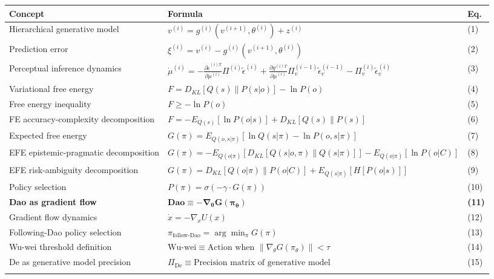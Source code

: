 \documentclass[11pt,a4paper]{article}
\begin{document}
\begin{longtable}{@{}p{4.5cm}p{8.5cm}p{1.5cm}@{}}
\toprule
\textbf{Concept} & \textbf{Formula} & \textbf{Eq.} \\
\midrule
Hierarchical generative model & $v^{(i)} = g^{(i)}(v^{(i+1)}, \theta^{(i)}) + z^{(i)}$ & (1) \\
\addlinespace
Prediction error & $\xi^{(i)} = v^{(i)} - g^{(i)}(v^{(i+1)}, \theta^{(i)})$ & (2) \\
\addlinespace
Perceptual inference dynamics & $\dot{\mu}^{(i)} = -\frac{\partial \tilde{\epsilon}^{(i)T}}{\partial \mu^{(i)}} \Pi^{(i)} \tilde{\epsilon}^{(i)} + \frac{\partial g^{(i)T}}{\partial \mu^{(i)}} \Pi_{v}^{(i-1)} \tilde{\epsilon}_{v}^{(i-1)} - \Pi_{v}^{(i)} \tilde{\epsilon}_{v}^{(i)}$ & (3) \\
\addlinespace
Variational free energy & $F = D_{KL}[Q(s) \| P(s|o)] - \ln P(o)$ & (4) \\
\addlinespace
Free energy inequality & $F \geq -\ln P(o)$ & (5) \\
\addlinespace
FE accuracy-complexity decomposition & $F = -E_{Q(s)}[\ln P(o|s)] + D_{KL}[Q(s) \| P(s)]$ & (6) \\
\addlinespace
Expected free energy & $G(\pi) = E_{Q(o, s|\pi)}[\ln Q(s|\pi) - \ln P(o, s|\pi)]$ & (7) \\
\addlinespace
EFE epistemic-pragmatic decomposition & $G(\pi) = -E_{Q(o|\pi)}[D_{KL}[Q(s|o, \pi) \| Q(s|\pi)]] - E_{Q(o|\pi)}[\ln P(o|C)]$ & (8) \\
\addlinespace
EFE risk-ambiguity decomposition & $G(\pi) = D_{KL}[Q(o|\pi) \| P(o|C)] + E_{Q(s|\pi)}[H[P(o|s)]]$ & (9) \\
\addlinespace
Policy selection & $P(\pi) = \sigma(-\gamma \cdot G(\pi))$ & (10) \\
\addlinespace
\textbf{Dao as gradient flow} & $\mathbf{\text{Dao} \equiv -\nabla_\theta G(\pi_\theta)}$ & \textbf{(11)} \\
\addlinespace
Gradient flow dynamics & $\dot{x} = -\nabla_x U(x)$ & (12) \\
\addlinespace
Following-Dao policy selection & $\pi_{\text{follow-Dao}} = \arg\min_\pi G(\pi)$ & (13) \\
\addlinespace
Wu-wei threshold definition & $\text{Wu-wei} \equiv \text{Action when } \|\nabla_\theta G(\pi_\theta)\| < \tau$ & (14) \\
\addlinespace
De as generative model precision & $\Pi_{\text{De}} \equiv \text{Precision matrix of generative model}$ & (15) \\
\addlinespace

\end{longtable}
\end{document}
